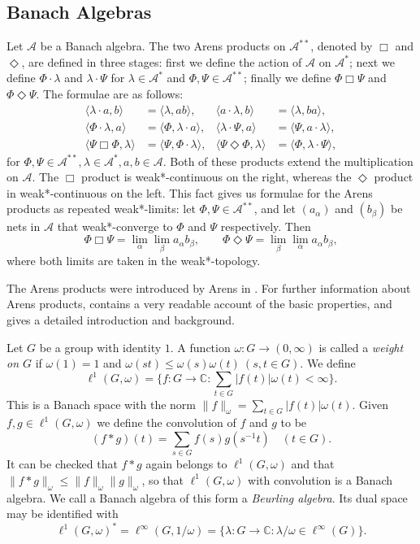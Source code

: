 \documentclass[twoside,11pt]{amsart}
\numberwithin{equation}{section}
\theoremstyle{definition}
\newcommand {\C}{\mathbb C}
\newcommand {\A}{\mathcal A}
\newcommand{\1}{\mathbbm{1}}
\begin{document}
	\subsection{Banach Algebras}
	Let $\A$ be a Banach algebra. The two Arens products on $\A^{**}$, denoted by $\Box$ and $\Diamond$, are defined in three stages: first we define the action of $\A$ on $\A^*$; next we define $\Phi \cdot \lambda$ and $\lambda \cdot \Psi$ for $\lambda \in \A^*$ and $\Phi, \Psi \in \A^{**}$; finally we define $\Phi \Box \Psi$ and $\Phi \Diamond \Psi$. The formulae are as follows:
	\begin{align*}
		\langle \lambda \cdot a, b \rangle  &= \langle \lambda, ab \rangle, &
		\langle a \cdot \lambda, b \rangle &= \langle \lambda, ba \rangle, \\
		\langle \Phi \cdot \lambda, a \rangle &= \langle \Phi, \lambda \cdot a \rangle, &
		\langle \lambda \cdot \Psi, a \rangle &= \langle \Psi, a \cdot \lambda \rangle, \\
		\langle \Psi \Box \Phi, \lambda \rangle &= \langle \Psi, \Phi \cdot \lambda \rangle, &
		\langle \Psi \Diamond \Phi, \lambda \rangle &= \langle \Phi, \lambda \cdot \Psi \rangle, 
	\end{align*}
	for $\Phi, \Psi \in \A^{**}, \lambda \in \A^*, a, b \in \A$. Both of these products extend the multiplication on $\A$. The $\Box$ product is weak*-continuous on the right, whereas the $\Diamond$ product in weak*-continuous on the left. This fact gives us formulae for the Arens products as repeated weak*-limits: let $\Phi, \Psi \in \A^{**}$, and let $(a_\alpha)$ and $(b_\beta)$ be nets in $\A$ that weak*-converge to $\Phi$ and $\Psi$ respectively. Then 
	\begin{equation}		\label{eqArens}
	\Phi \Box \Psi = \lim_\alpha \lim_\beta a_\alpha b_\beta, 
	\qquad
	\Phi \Diamond \Psi = \lim_\beta \lim_\alpha a_\alpha b_\beta,
	\end{equation}
	where both limits are taken in the weak*-topology.
	
	The Arens products were introduced by Arens in \cite{Ar1, Ar2}. For further information about Arens products, \cite[Chapter 1.4]{Palmer} contains a very readable account of the basic properties, and \cite{DL} gives a detailed introduction and background.
	
	Let $G$ be a group with identity $1$. A function $\omega \colon G \to (0, \infty)$ is called a \textit{weight on $G$} if $\omega(1) = 1$ and $\omega(st) \leq \omega(s)\omega(t) \ (s,t \in G)$. We define 
	$$\ell^1(G, \omega) = \{ f \colon G \to \C : \sum_{t \in G} |f(t)| \omega(t) <\infty \}.$$
	This is a Banach space with the norm $\|f\|_\omega = \sum_{t \in G} |f(t)| \omega(t)$. Given $f,g \in \ell^1(G, \omega)$ we define the convolution of $f$ and $g$ to be 
	$$(f*g)(t) = \sum_{s \in G} f(s)g(s^{-1}t) \quad (t \in G).$$
	It can be checked that $f*g$ again belongs to $\ell^1(G, \omega)$ and that $\|f*g\|_\omega \leq \|f\|_\omega \|g\|_\omega$, so that $\ell^1(G, \omega)$ with convolution is a Banach algebra. We call a Banach algebra of this form a \textit{Beurling algebra}. Its dual space may be identified with 
	$$\ell^1(G,\omega)^* = \ell^\infty(G, 1/\omega) = \{ \lambda \colon G \to \C : \lambda/\omega \in \ell^\infty(G) \}.$$
	
\end{document}
